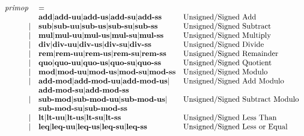 \documentclass[12pt]{article}
\begin{document}
\[
\begin{array}{rll}
\text{\em primop\ }     &= \\
                &\text{\bf add}        \vert \text{\bf add-uu}     \vert \text{\bf add-us}     \vert \text{\bf add-su}   \vert \text{\bf add-ss}     &\text{Unsigned/Signed Add}\\
\vert           &\text{\bf sub}        \vert \text{\bf sub-uu}     \vert \text{\bf sub-us}     \vert \text{\bf sub-su}   \vert \text{\bf sub-ss}     &\text{Unsigned/Signed Subtract}\\
\vert           &\text{\bf mul}        \vert \text{\bf mul-uu}     \vert \text{\bf mul-us}     \vert \text{\bf mul-su}   \vert \text{\bf mul-ss}     &\text{Unsigned/Signed Multiply}\\
\vert           &\text{\bf div}        \vert \text{\bf div-uu}     \vert \text{\bf div-us}     \vert \text{\bf div-su}   \vert \text{\bf div-ss}     &\text{Unsigned/Signed Divide}\\
\vert           &\text{\bf rem}        \vert \text{\bf rem-uu}     \vert \text{\bf rem-us}     \vert \text{\bf rem-su}   \vert \text{\bf rem-ss}     &\text{Unsigned/Signed Remainder}\\
\vert           &\text{\bf quo}        \vert \text{\bf quo-uu}     \vert \text{\bf quo-us}     \vert \text{\bf quo-su}   \vert \text{\bf quo-ss}     &\text{Unsigned/Signed Quotient}\\
\vert           &\text{\bf mod}        \vert \text{\bf mod-uu}     \vert \text{\bf mod-us}     \vert \text{\bf mod-su}   \vert \text{\bf mod-ss}     &\text{Unsigned/Signed Modulo}\\
\vert           &\text{\bf add-mod}    \vert \text{\bf add-mod-uu} \vert \text{\bf add-mod-us} \vert                                       &\text{Unsigned/Signed Add Modulo}\\
                &\text{\bf add-mod-su} \vert \text{\bf add-mod-ss}                                                                    &\\ 
\vert           &\text{\bf sub-mod}    \vert \text{\bf sub-mod-uu} \vert \text{\bf sub-mod-us} \vert                                       &\text{Unsigned/Signed Subtract Modulo}\\
                &\text{\bf sub-mod-su} \vert \text{\bf sub-mod-ss}                                                                    &\\
\vert           &\text{\bf lt}         \vert \text{\bf lt-uu}      \vert \text{\bf lt-us}      \vert \text{\bf lt-su}    \vert \text{\bf lt-ss}      &\text{Unsigned/Signed Less Than}\\
\vert           &\text{\bf leq}        \vert \text{\bf leq-uu}     \vert \text{\bf leq-us}     \vert \text{\bf leq-su}   \vert \text{\bf leq-ss}     &\text{Unsigned/Signed Less or Equal}\\

\end{array}\]
\end{document}
